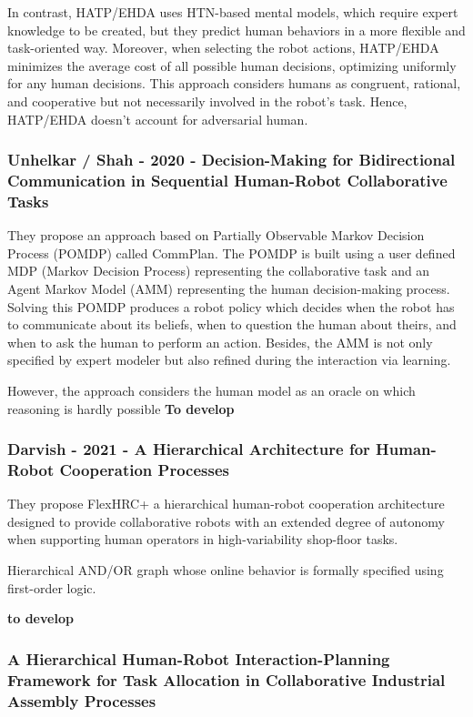In contrast, HATP/EHDA uses HTN-based mental models, which require expert knowledge to be created, but they predict human behaviors in a more flexible and task-oriented way.
Moreover, when selecting the robot actions, HATP/EHDA minimizes the average cost of all possible human decisions, optimizing uniformly for any human decisions. This approach considers humans as congruent, rational, and cooperative but not necessarily involved in the robot's task. Hence, HATP/EHDA doesn't account for adversarial human.

\subsubsection{Unhelkar / Shah - 2020 - Decision-Making for Bidirectional Communication in Sequential Human-Robot Collaborative Tasks}

They propose an approach based on Partially Observable Markov Decision Process (POMDP) called CommPlan. The POMDP is built using a user defined MDP (Markov Decision Process) representing the collaborative task and an Agent Markov Model (AMM) representing the human decision-making process. Solving this POMDP produces a robot policy which decides when the robot has to communicate about its beliefs, when to question the human about theirs, and when to ask the human to perform an action.
Besides, the AMM is not only specified by expert modeler but also refined during the interaction via learning. 

However, the approach considers the human model as an oracle on which reasoning is hardly possible \textbf{To develop}

\subsubsection{Darvish - 2021 - A Hierarchical Architecture for Human-Robot Cooperation Processes}

They propose FlexHRC+ a hierarchical human-robot cooperation architecture designed to provide collaborative robots with an extended degree of autonomy when supporting human operators in high-variability shop-floor tasks. 

Hierarchical AND/OR graph whose online behavior is formally specified using first-order logic. 

\textbf{to develop}

\subsubsection{A Hierarchical Human-Robot Interaction-Planning Framework for Task Allocation in Collaborative Industrial Assembly Processes}

